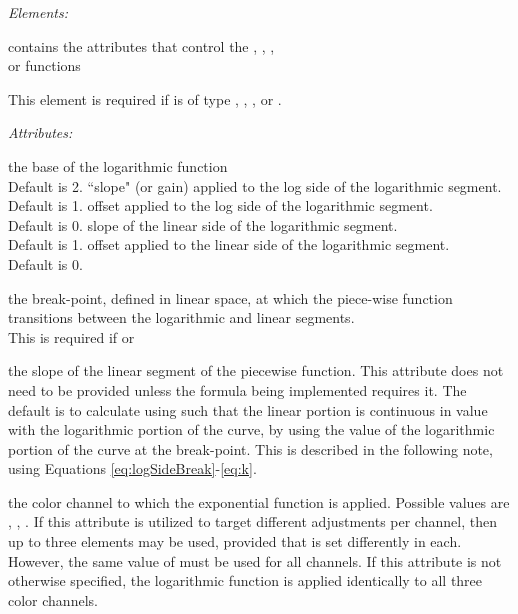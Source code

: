\emph{Elements:}
\begin{xmlfields}
     contains the attributes that control the , , , \\or {} functions \par
    
    This element is required if  is of type , , , or .

    \emph{Attributes:}  
    \begin{xmlfields}
        \xmlitem["base"][optional] the base of the logarithmic function \\Default is 2.
        \xmlitem["logSideSlope"][optional] ``slope" (or gain) applied to the log side of the logarithmic segment. \\Default is 1.
        \xmlitem["logSideOffset"][optional] offset applied to the log side of the logarithmic segment. \\Default is 0.
        \xmlitem["linSideSlope"][optional] slope of the linear side of the logarithmic segment. \\Default is 1.
        \xmlitem["linSideOffset"][optional] offset applied to the linear side of the logarithmic segment. \\Default is 0.

        \xmlitem["linSideBreak"][optional] the break-point, defined in linear space, at which the piece-wise function transitions between the logarithmic and linear segments. \\This is required if  or 
        
        \xmlitem["linearSlope"][optional] the slope of the linear segment of the piecewise function. This attribute does not need to be provided unless the formula being implemented requires it. The default is to calculate using  such that the linear portion is continuous in value with the logarithmic portion of the curve, by using the value of the logarithmic portion of the curve at the break-point. This is described in the following note, using Equations \ref{eq:logSideBreak}-\ref{eq:k}.
        
        \xmlitem["channel"][optional] the color channel to which the exponential function is applied. Possible values are , , .
        If this attribute is utilized to target different adjustments per channel, then up to three  elements may be used, provided that  is set differently in each. However, the same value of  must be used for all channels. If this attribute is not otherwise specified, the logarithmic function is applied identically to all three color channels.     
    \end{xmlfields}

\end{xmlfields}

